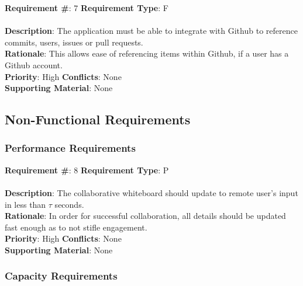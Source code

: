 \documentclass[11pt, oneside]{article}
\begin{document}
\begin{framed}
	\noindent\textbf{Requirement \#}: 7 \hfill \textbf{Requirement Type}: F \hfill\\\\
	\noindent\textbf{Description}: The application must be able to integrate with Github to reference commits, users, issues or pull requests. \\
	\textbf{Rationale}: This allows ease of referencing items within Github, if a user has a Github account. \\
	\textbf{Priority}: High \hfill \textbf{Conflicts}: None \hfill\\
	\textbf{Supporting Material}: None\\
\end{framed}

\subsection{Non-Functional Requirements}

\subsubsection{Performance Requirements}

\begin{framed}
	\noindent\textbf{Requirement \#}: 8 \hfill \textbf{Requirement Type}: P \hfill\\\\
	\noindent\textbf{Description}: The collaborative whiteboard should update to remote user's input in less than $\tau$ seconds. \\
	\textbf{Rationale}: In order for successful collaboration, all details should be updated fast enough as to not stifle engagement. \\
	\textbf{Priority}: High \hfill \textbf{Conflicts}: None \hfill\\
	\textbf{Supporting Material}: None\\
\end{framed}

\subsubsection{Capacity Requirements}
\end{document}
